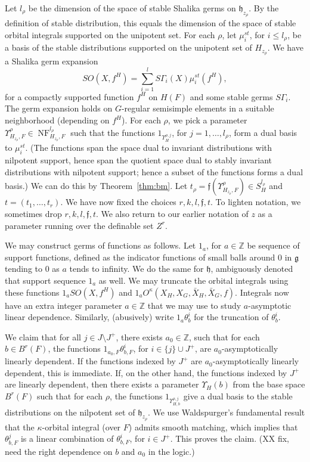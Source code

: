 \documentclass[12pt]{amsart}
\newcommand{\op}[1]{\operatorname{#1}}
\newcommand{\ring}[1]{{\mathbb #1}}
\def\NF{\op{NF}}
\def\Y{\Upsilon}
\def\s{{\mathfrak{f}}}
\newcommand{\fg}{\mathfrak{g}}
\newcommand{\fh}{\mathfrak{h}}
\theoremstyle{plain}
\theoremstyle{definition}
\begin{document}
Let $l_\rho$ be the dimension of the space of stable Shalika germs on
$\fh_{z_\rho}$.  By the definition of stable distribution, this equals
the dimension of the space of stable orbital integrals supported on
the unipotent set.  For each $\rho$, let $\mu_i^{st}$, for $i\le l_\rho$,
be a basis of the stable distributions supported on the unipotent set
of $H_{z_\rho}$.  We have a Shalika germ expansion
\[
SO(X,f^H) = \sum_{i=1}^l S\Gamma_i(X) \mu_i^{st}(f^H),
\]
for a compactly supported function $f^H$ on $H(F)$ and some stable
germs $S\Gamma_i$.  The germ
expansion holds on $G$-regular semisimple elements in a suitable
neighborhood (depending on $f^H$).  For each $\rho$, we pick a
parameter $\Y^\rho_{H_{z_\rho},F}\in \NF^{l_\rho}_{H_{z_\rho},F}$ such
that the functions $1_{\Y_H^{\rho,j}}$, for $j=1,\ldots,l_\rho$, form a
dual basis to $\mu_i^{st}$.  (The functions span the space dual to
invariant distributions with nilpotent support, hence span the
quotient space dual to stably invariant distributions with nilpotent
support; hence a subset of the functions forms a dual basis.)  We can
do this by Theorem~\ref{thm:bm}.  Let $t_\rho = \s(\Y^\rho_{H_{z_\rho},F})\in
S^{l_\rho}_{H}$ and $t = (t_1,\ldots,t_r)$.  We have now fixed the
choices $r,k,l,\s,t$.  To lighten notation, we sometimes drop
$r,k,l,\s,t$.  We also return to our earlier notation of $z$ as a
parameter running over the definable set $Z^r$.

We may construct germs of functions as follows.  Let $1_a$, for
$a\in\ring{Z}$ be sequence of support functions, defined as the
indicator functions of small balls around $0$ in $\fg$ tending to $0$
as $a$ tends to infinity.  We do the same for $\fh$, ambiguously
denoted that support sequence $1_a$ as well.  We may truncate the
orbital integrals using these functions $1_a SO(X,f^H)$ and $1_a
O^\kappa(X_H,X_G,\bar X_H,\bar X_G,f)$.  Integrals now have an extra
integer parameter $a\in\ring{Z}$ that we may use to study
$a$-asymptotic linear dependence.  Similarly, (abusively) write $1_a\theta^i_b$
for the truncation of $\theta^i_b$.

We claim that for all $j \in J\setminus J^+$, there exists
$a_0\in\ring{Z}$, such that for each $b\in
B^r(F)$, the functions $1_{a_0,F}\theta^i_{b,F}$, for $i\in \{j\}\cup J^+$,
are $a_0$-asymptotically linearly dependent.  If the functions indexed by $J^+$ are
$a_0$-asymptotically linearly dependent, this is immediate.  If, on the other hand, the
functions indexed by $J^+$ are linearly dependent, then there exists
a parameter $\Y_H(b)$ from the base space $B^r(F)$ such that for each
$\rho$, the functions $1_{\Y_{H,b}^{\rho,j}}$ give a dual basis to the
stable distributions on the nilpotent set of $\fh_{z_\rho}$.  We use
Waldspurger's fundamental result \cite{W} that the $\kappa$-orbital
integral (over $F$) admits smooth matching, which implies that
$\theta^{j}_{b,F}$ is a linear combination of $\theta^i_{b,F}$, for
$i\in J^+$.  This proves the claim.
(XX fix, need the right dependence on $b$ and $a_0$ in the logic.)
\end{document}
